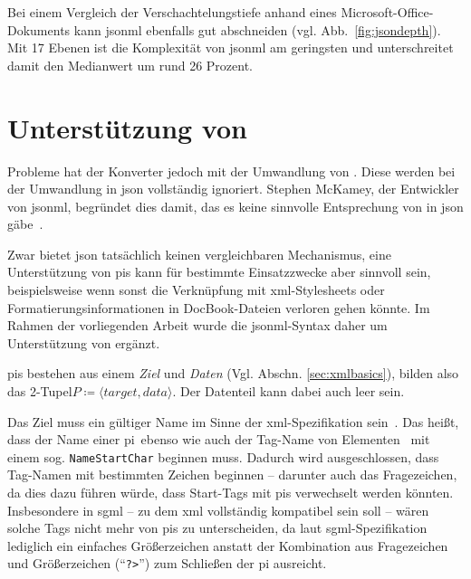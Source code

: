 Bei einem Vergleich der Verschachtelungstiefe anhand eines Microsoft\hyp{}Office\hyp{}Dokuments kann \acrshort{jsonml} ebenfalls gut abschneiden (vgl. Abb.~\ref{fig:jsondepth}). Mit 17 Ebenen ist die Komplexität von \acrshort{jsonml} am geringsten und unterschreitet damit den Medianwert um rund 26 Prozent.

\section{Unterstützung von }

Probleme hat der Konverter jedoch mit der Umwandlung von . Diese werden bei der Umwandlung in \acrshort{json} vollständig ignoriert. Stephen McKamey, der Entwickler von \acrshort{jsonml}, begründet dies damit, das es keine sinnvolle Entsprechung von  in \acrshort{json} gäbe~\cite{mckamey2006xml}.

Zwar bietet \acrshort{json} tatsächlich keinen vergleichbaren Mechanismus, eine Unterstützung von \glspl{pi} kann für bestimmte Einsatzzwecke aber sinnvoll sein, beispielsweise wenn sonst die Verknüpfung mit \acrshort{xml}-Stylesheets oder Formatierungsinformationen in DocBook\hyp{}Dateien verloren gehen könnte. Im Rahmen der vorliegenden Arbeit wurde die \acrshort{jsonml}-Syntax daher um Unterstützung von  ergänzt.

\glspl{pi} bestehen aus einem \emph{Ziel} und \emph{Daten} (Vgl. Abschn. \ref{sec:xmlbasics}), bilden also das 2-Tupel\linebreak{}$P \coloneqq \langle target, data \rangle$. Der Datenteil kann dabei auch leer sein.

Das Ziel muss ein gültiger Name im Sinne der \acrshort{xml}-Spezifikation sein~\cite[{Regel~[17]}]{xml}. Das heißt, dass der Name einer \gls{pi}\ ebenso wie auch der Tag-Name von Elementen~\cite[{Regel~[40]}]{xml} mit einem sog. \texttt{NameStartChar} beginnen muss. Dadurch wird ausgeschlossen, dass Tag-Namen mit bestimmten Zeichen beginnen -- darunter auch das Fragezeichen, da dies dazu führen würde, dass Start-Tags mit \glspl{pi} verwechselt werden könnten. Insbesondere in \acrshort{sgml} -- zu dem \acrshort{xml} vollständig kompatibel sein soll -- wären solche Tags nicht mehr von \glspl{pi} zu unterscheiden, da laut \acrshort{sgml}-Spezifikation lediglich ein einfaches Größerzeichen anstatt der Kombination aus Fragezeichen und Größerzeichen (\enquote{\texttt{?>}}) zum Schließen der \gls{pi} ausreicht.

